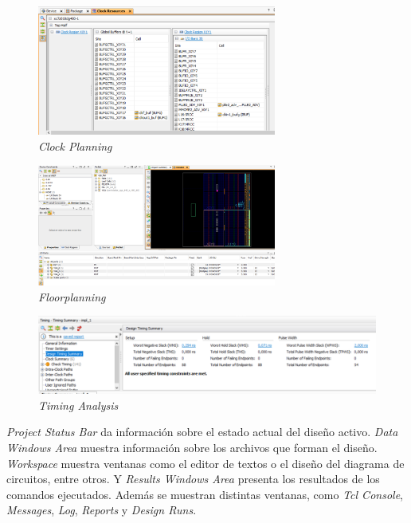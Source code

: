 \begin{figure}[H]
    \centering
    \includegraphics[width = 0.7\textwidth]{imagenes/clock.png}
    \caption{\textit{Clock Planning}}\label{clock}
\end{figure}

\begin{figure}[H]
    \centering
    \includegraphics[width = 0.7\textwidth]{imagenes/fp.png}
    \caption{\textit{Floorplanning}}\label{fp}
\end{figure}

\begin{figure}[H]
    \centering
    \includegraphics[width = 1\textwidth]{imagenes/ta.png}
    \caption{\textit{Timing Analysis}}\label{ta}
\end{figure}

\textit{Project Status Bar} da información sobre el estado actual del diseño activo. \textit{Data Windows Area} muestra información 
sobre los archivos que forman el diseño. \textit{Workspace} muestra ventanas como el editor de textos o el diseño del diagrama de 
circuitos, entre otros. Y \textit{Results Windows Area} presenta los resultados de los comandos ejecutados. Además se muestran 
distintas ventanas, como \textit{Tcl Console}, \textit{Messages}, \textit{Log}, \textit{Reports} y \textit{Design Runs}.


